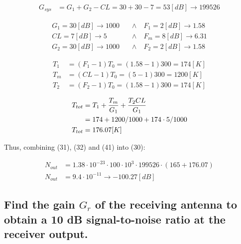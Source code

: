 \documentclass[12pt, letterpaper]{article}
\begin{document}
\begin{align}
  G_{sys}
  &=
  G_1+G_2-CL
  =
  30+30-7
  =
  53[dB]
  \rightarrow
  199526
\end{align}

\begin{align}
  G_1
  =
  30[dB]
  \rightarrow
  1000
  \quad&\wedge\quad
  F_1
  =
  2[dB]
  \rightarrow
  1.58
  \\
  CL
  =
  7[dB]
  \rightarrow
  5
  \quad&\wedge\quad
  F_{m}
  =
  8[dB]
  \rightarrow
  6.31
  \\
  G_2
  =
  30[dB]
  \rightarrow
  1000
  \quad&\wedge\quad
  F_2
  =
  2[dB]
  \rightarrow
  1.58
\end{align}

\begin{align}
  T_1
  &=
  (F_1-1)T_0
  =
  (1.58-1)300=174[K]
  \\
  T_m
  &=
  (CL-1)T_0
  =
  (5-1)300=1200[K]
  \\
  T_2
  &=
  (F_2-1)T_0
  =
  (1.58-1)300=174[K]
\end{align}

\begin{align}
  T_{tot}
  &=
  T_1
  +
  {T_m\over G_1}
  +
  {T_2CL\over G_1}
  \\
  &=
  174
  +
  {1200/1000}
  +
  174\cdot5/1000
  \\
  T_{tot}
  &=
  176.07[K]
\end{align}


\vspace{1em}
\begin{center}
  Thus, combining (31), (32) and (41) into (30):
\end{center}

\begin{align}
  N_{out}
  &=
  1.38\cdot10^{-23}
  \cdot
  100\cdot 10^3
  \cdot
  199526
  \cdot
  (165+176.07)
  \\
  N_{out}
  &=
  9.4\cdot10^{-11}
  \rightarrow
  -100.27[dB]
\end{align}




\subsection{Find the gain $G_r$ of the receiving antenna to obtain a 10 dB signal-to-noise ratio at the receiver output.}
\end{document}
